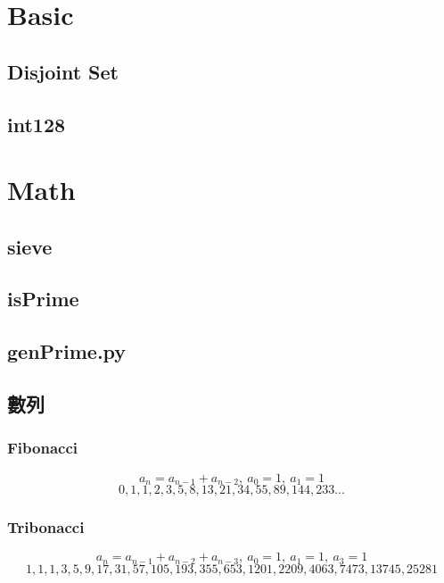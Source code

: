 \section{Basic}

\subsection{Disjoint Set}


\subsection{int128}


\section{Math}

\subsection{sieve}


\subsection{isPrime}


\subsection{genPrime.py}


\subsection{數列}
\subsubsection{Fibonacci}
\[a_{n} = a_{n-1} + a_{n-2},\ a_0 = 1,\ a_1 = 1\]
\[0, 1, 1, 2, 3, 5, 8, 13, 21, 34, 55, 89, 144, 233...\]

\subsubsection{Tribonacci}
\[a_{n} = a_{n-1} + a_{n-2} + a_{n-3},\ a_0 = 1,\ a_1 = 1,\ a_3 = 1\]
\[1, 1, 1, 3, 5, 9, 17, 31, 57, 105, 193, 355, 653, 1201, 2209, 4063, 7473, 13745, 25281\]

